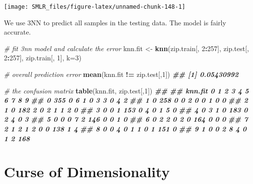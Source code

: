 \documentclass[
]{book}
\newenvironment{Shaded}{\begin{snugshade}}{\end{snugshade}}
\newcommand{\AttributeTok}[1]{\textcolor[rgb]{0.13,0.29,0.53}{#1}}
\newcommand{\CommentTok}[1]{\textcolor[rgb]{0.56,0.35,0.01}{\textit{#1}}}
\newcommand{\DecValTok}[1]{\textcolor[rgb]{0.00,0.00,0.81}{#1}}
\newcommand{\DocumentationTok}[1]{\textcolor[rgb]{0.56,0.35,0.01}{\textbf{\textit{#1}}}}
\newcommand{\FunctionTok}[1]{\textcolor[rgb]{0.13,0.29,0.53}{\textbf{#1}}}
\newcommand{\NormalTok}[1]{#1}
\newcommand{\OtherTok}[1]{\textcolor[rgb]{0.56,0.35,0.01}{#1}}
\newcommand{\SpecialCharTok}[1]{\textcolor[rgb]{0.81,0.36,0.00}{\textbf{#1}}}
\theoremstyle{definition}
\theoremstyle{definition}
\theoremstyle{definition}
\theoremstyle{definition}
\theoremstyle{remark}
\begin{document}
\begin{center}\texttt{[image: SMLR\_files/figure-latex/unnamed-chunk-148-1]} \end{center}

We use 3NN to predict all samples in the testing data. The model is fairly accurate.

\begin{Shaded}
\begin{Highlighting}[]
  \CommentTok{\# fit 3nn model and calculate the error}
\NormalTok{  knn.fit }\OtherTok{\textless{}{-}} \FunctionTok{knn}\NormalTok{(zip.train[, }\DecValTok{2}\SpecialCharTok{:}\DecValTok{257}\NormalTok{], zip.test[, }\DecValTok{2}\SpecialCharTok{:}\DecValTok{257}\NormalTok{], zip.train[, }\DecValTok{1}\NormalTok{], }\AttributeTok{k=}\DecValTok{3}\NormalTok{)}
  
  \CommentTok{\# overall prediction error}
  \FunctionTok{mean}\NormalTok{(knn.fit }\SpecialCharTok{!=}\NormalTok{ zip.test[,}\DecValTok{1}\NormalTok{])}
\DocumentationTok{\#\# [1] 0.05430992}
  
  \CommentTok{\# the confusion matrix}
  \FunctionTok{table}\NormalTok{(knn.fit, zip.test[,}\DecValTok{1}\NormalTok{])}
\DocumentationTok{\#\#        }
\DocumentationTok{\#\# knn.fit   0   1   2   3   4   5   6   7   8   9}
\DocumentationTok{\#\#       0 355   0   6   1   0   3   3   0   4   2}
\DocumentationTok{\#\#       1   0 258   0   0   2   0   0   1   0   0}
\DocumentationTok{\#\#       2   1   0 182   2   0   2   1   1   2   0}
\DocumentationTok{\#\#       3   0   0   1 153   0   4   0   1   5   0}
\DocumentationTok{\#\#       4   0   3   1   0 183   0   2   4   0   3}
\DocumentationTok{\#\#       5   0   0   0   7   2 146   0   0   1   0}
\DocumentationTok{\#\#       6   0   2   2   0   2   0 164   0   0   0}
\DocumentationTok{\#\#       7   2   1   2   1   2   0   0 138   1   4}
\DocumentationTok{\#\#       8   0   0   4   0   1   1   0   1 151   0}
\DocumentationTok{\#\#       9   1   0   0   2   8   4   0   1   2 168}
\end{Highlighting}
\end{Shaded}

\hypertarget{curse-of-dimensionality}{%
\section{Curse of Dimensionality}\label{curse-of-dimensionality}}
\end{document}
